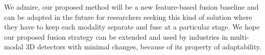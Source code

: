 \documentclass[10pt,twocolumn,letterpaper]{article}
\begin{document}
We admire, our proposed method will be a new feature-based fusion baseline and can be adapted in the future for researchers seeking this kind of solution where they have to keep each modality separate and fuse at a particular stage. We hope our proposed fusion strategy can be extended and used by industries in multi-modal 3D detectors with minimal changes, because of its property of adaptability.


{\small


}
\end{document}
